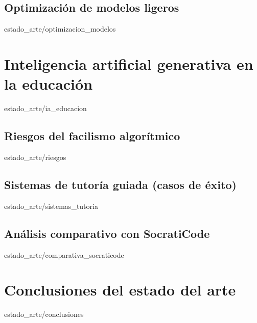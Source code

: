 \documentclass[epsbased,copyright,final,printable,covers,extendedindex,firstnumbered,tfg,gnuplot,lof,lot,loc]{tfgtfmthesisuam}
\begin{document}
    \subsection{Optimización de modelos ligeros\label{SS:EA_LLM_OPTIMIZACION}}{estado_arte/optimizacion_modelos}
  \section{Inteligencia artificial generativa en la educación\label{SEC:EA_IA_EDU}}{estado_arte/ia_educacion}
    \subsection{Riesgos del facilismo algorítmico\label{SS:EA_IA_RIESGOS}}{estado_arte/riesgos}
    \subsection{Sistemas de tutoría guiada (casos de éxito)\label{SS:EA_IA_TUTORIA}}{estado_arte/sistemas_tutoria}
    \subsection{Análisis comparativo con SocratiCode\label{SS:EA_IA_COMPARATIVA}}{estado_arte/comparativa_socraticode}
  \section{Conclusiones del estado del arte\label{SEC:EA_CONCLUSIONES}}{estado_arte/conclusiones}
\end{document}
